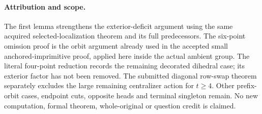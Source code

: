 \documentclass[11pt,a4paper]{article}
\begin{document}
\paragraph{Attribution and scope.}
The first lemma strengthens the exterior-deficit argument using
the same acquired selected-localization theorem and its full
predecessors. The six-point omission proof is the orbit argument
already used in the accepted small anchored-imprimitive proof,
applied here inside the actual ambient group. The literal
four-point reduction records the remaining decorated dihedral
case; its exterior factor has not been removed. The submitted
diagonal row-swap theorem separately excludes the large remaining
centralizer action for $t\ge4$. Other prefix-orbit cases,
endpoint cuts, opposite heads and terminal singleton remain.
No new computation, formal theorem, whole-original or question
credit is claimed.
\end{document}
